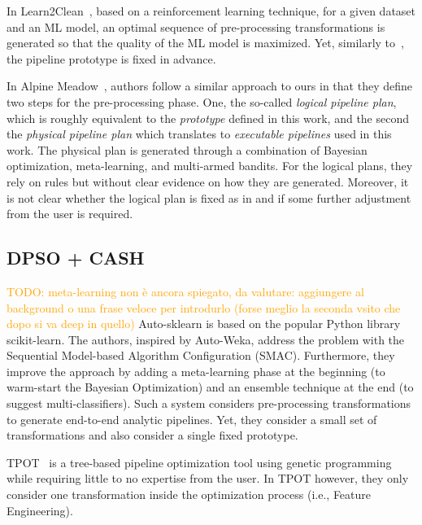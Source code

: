 In Learn2Clean~\cite{Berti19WWW}, based on a reinforcement learning technique, for a given dataset and an ML model, an optimal sequence of pre-processing transformations is generated so that the quality of the ML model is maximized.
Yet, similarly to~\cite{Quemy20InfSystems}, the pipeline prototype is fixed in advance.

In Alpine Meadow~\cite{Shang19SIGMOD}, authors follow a similar approach to ours in that they define two steps for the pre-processing phase. One, the so-called \textit{logical pipeline plan}, which is roughly equivalent to the \textit{prototype} defined in this work, and the second the \textit{physical pipeline plan} which translates to \textit{executable pipelines} used in this work.
The physical plan is generated through a combination of Bayesian optimization, meta-learning, and multi-armed bandits.
For the logical plans, they rely on rules but without clear evidence on how they are generated.
Moreover, it is not clear whether the logical plan is fixed as in \cite{Quemy20InfSystems} and if some further adjustment from the user is required.

\subsection{DPSO + CASH}
\label{effective-ssec:dpso-cash}
\textcolor{orange}{TODO: meta-learning non è ancora spiegato, da valutare: aggiungere al background o una frase veloce per introdurlo (forse meglio la seconda vsito che dopo si va deep in quello)}
Auto-sklearn \cite{Feurer15AutoSklearn} is based on the popular Python library scikit-learn.
The authors, inspired by Auto-Weka, address the problem with the Sequential Model-based Algorithm Configuration (SMAC).
Furthermore, they improve the approach by adding a meta-learning phase at the beginning (to warm-start the Bayesian Optimization) and an ensemble technique at the end (to suggest multi-classifiers).
Such a system considers pre-processing transformations to generate end-to-end analytic pipelines.
Yet, they consider a small set of transformations and also consider a single fixed prototype.

TPOT~\cite{Olson16Tpot} is a tree-based pipeline optimization tool using genetic programming while requiring little to no expertise from the user.
In TPOT however, they only consider one transformation inside the optimization process (i.e., Feature Engineering).

